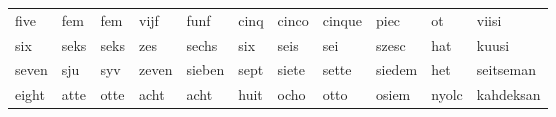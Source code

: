 \documentclass[a4paper, 20pt]{article}
\begin{document}
\begin{table}[h]
{\begin{tabular}{|lllllllllll|}
five                                                 & fem                                                   & fem                                                  & vijf                                                    & funf                                                 & cinq                                                   & cinco                                                  & cinque                                                 & piec                                                 & ot                                                    & viisi                                                \\
six                                                  & seks                                                  & seks                                                 & zes                                                     & sechs                                                & six                                                    & seis                                                   & sei                                                    & szesc                                                & hat                                                   & kuusi                                                \\
seven                                                & sju                                                   & syv                                                  & zeven                                                   & sieben                                               & sept                                                   & siete                                                  & sette                                                  & siedem                                               & het                                                   & seitseman                                            \\
eight                                                & atte                                                  & otte                                                 & acht                                                    & acht                                                 & huit                                                   & ocho                                                   & otto                                                   & osiem                                                & nyolc                                                 & kahdeksan                                            \\

\end{tabular}}
\end{table}
\end{document}
